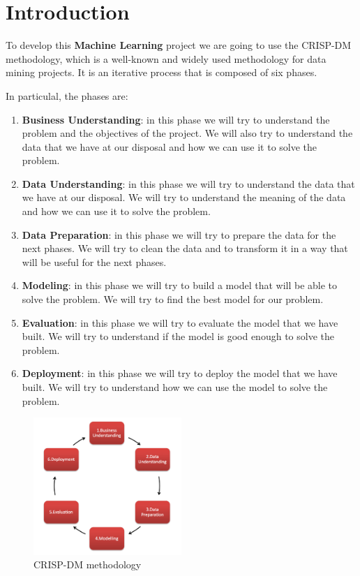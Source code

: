 \chapter{Introduction}
\label{sec:introduction}

To develop this \textbf{Machine Learning} project we are going to use the CRISP-DM methodology, which is a well-known and widely used methodology for data mining projects. It is an iterative process that is composed of six phases.

In particulal, the phases are:
\begin{enumerate}
    \item \textbf{Business Understanding}: in this phase we will try to understand the problem and the objectives of the project. We will also try to understand the data that we have at our disposal and how we can use it to solve the problem.
    \item \textbf{Data Understanding}: in this phase we will try to understand the data that we have at our disposal. We will try to understand the meaning of the data and how we can use it to solve the problem.
    \item \textbf{Data Preparation}: in this phase we will try to prepare the data for the next phases. We will try to clean the data and to transform it in a way that will be useful for the next phases.
    \item \textbf{Modeling}: in this phase we will try to build a model that will be able to solve the problem. We will try to find the best model for our problem.
    \item \textbf{Evaluation}: in this phase we will try to evaluate the model that we have built. We will try to understand if the model is good enough to solve the problem.
    \item \textbf{Deployment}: in this phase we will try to deploy the model that we have built. We will try to understand how we can use the model to solve the problem.
\end{enumerate}

\begin{figure}[H]
    \centering
    \includegraphics[width=0.5\textwidth]{imgs/crisp.png}
    \caption{CRISP-DM methodology}
    \label{fig:crisp-dm}
\end{figure}
\newpage
